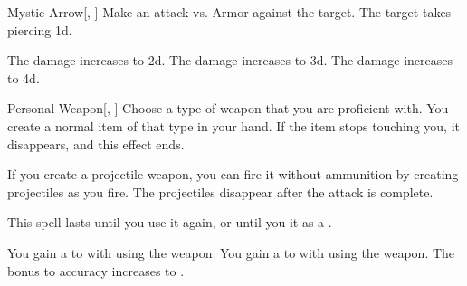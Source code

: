 \lowercase{\hypertarget{spell:Mystic Arrow}{}}\label{spell:Mystic Arrow}
\begin{freeability}[Rank 1]{\hypertarget{spell:Mystic Arrow}{Mystic Arrow}}[, ]
Make an attack vs. Armor against the target.
\hit The target takes piercing  \plus1d.

\rankline
{} The damage increases to  \plus2d.
 The damage increases to  \plus3d.
 The damage increases to  \plus4d.
\end{freeability}
\vspace{0.25em}



\lowercase{\hypertarget{spell:Personal Weapon}{}}\label{spell:Personal Weapon}
\begin{freeability}[Rank 1]{\hypertarget{spell:Personal Weapon}{Personal Weapon}}[, ]
Choose a type of weapon that you are proficient with.
You create a normal item of that type in your hand.
If the item stops touching you, it disappears, and this effect ends.

If you create a projectile weapon, you can fire it without ammunition by creating projectiles as you fire.
The projectiles disappear after the attack is complete.

This spell lasts until you use it again, or until you  it as a .

\rankline
{} You gain a   to  with  using the weapon.
 You gain a   to  with  using the weapon.
 The bonus to accuracy increases to .
\end{freeability}
\vspace{0.25em}



